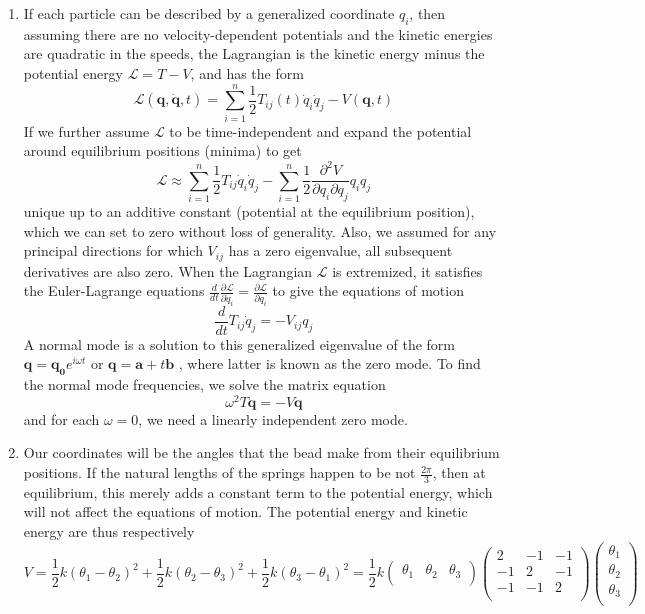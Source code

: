 \documentclass[a4paper]{article}
\begin{document}
\begin{ans}\leavevmode
\begin{enumerate}[label=(\alph*)]
\item If each particle can be described by a generalized coordinate $q_i$, then assuming there are no velocity-dependent potentials and the kinetic energies are quadratic in the speeds, the Lagrangian is the kinetic energy minus the potential energy $\mathcal{L}=T-V$, and has the form
$$\mathcal{L}(\mathbf{q},\mathbf{\dot{q}},t)=\sum_{i=1}^n\frac{1}{2}T_{ij}(t)\dot{q}_i\dot{q}_j-V(\mathbf{q},t)$$
If we further assume $\mathcal{L}$ to be time-independent and expand the potential around equilibrium positions (minima) to get
$$\mathcal{L}\approx\sum_{i=1}^n\frac{1}{2}T_{ij}\dot{q}_i\dot{q}_j-\sum_{i=1}^n\frac{1}{2}\frac{\partial^2V}{\partial q_i\partial q_j}q_iq_j$$
unique up to an additive constant (potential at the equilibrium position), which we can set to zero without loss of generality. Also, we assumed for any principal directions for which $V_{ij}$ has a zero eigenvalue, all subsequent derivatives are also zero. When the Lagrangian $\mathcal{L}$ is extremized, it satisfies the Euler-Lagrange equations $\frac{d}{dt}\frac{\partial\mathcal{L}}{\partial\dot{q}_i}=\frac{\partial\mathcal{L}}{\partial q_i}$ to give the equations of motion
$$\frac{d}{dt}T_{ij}\dot{q}_j=-V_{ij}q_j$$
A normal mode is a solution to this generalized eigenvalue of the form $\mathbf{q}=\mathbf{q_0}e^{i\omega t}$ or $\mathbf{q}=\mathbf{a}+t\mathbf{b}$
, where latter is known as the zero mode. To find the normal mode frequencies, we solve the matrix equation
$$\omega^2T\mathbf{q}=-V\mathbf{q}$$
and for each $\omega=0$, we need a linearly independent zero mode.
\item Our coordinates will be the angles that the bead make from their equilibrium positions. If the natural lengths of the springs happen to be not $\frac{2\pi}{3}$, then at equilibrium, this merely adds a constant term to the potential energy, which will not affect the equations of motion. The potential energy and kinetic energy are thus respectively
$$V=\frac{1}{2}k(\theta_1-\theta_2)^2+\frac{1}{2}k(\theta_2-\theta_3)^2+\frac{1}{2}k(\theta_3-\theta_1)^2=\frac{1}{2}k\begin{pmatrix}\theta_1&\theta_2&\theta_3\\\end{pmatrix}\begin{pmatrix}2&-1&-1\\-1&2&-1\\-1&-1&2\\\end{pmatrix}\begin{pmatrix}\theta_1\\\theta_2\\\theta_3\\\end{pmatrix}$$

\end{enumerate}
\end{ans}
\end{document}

